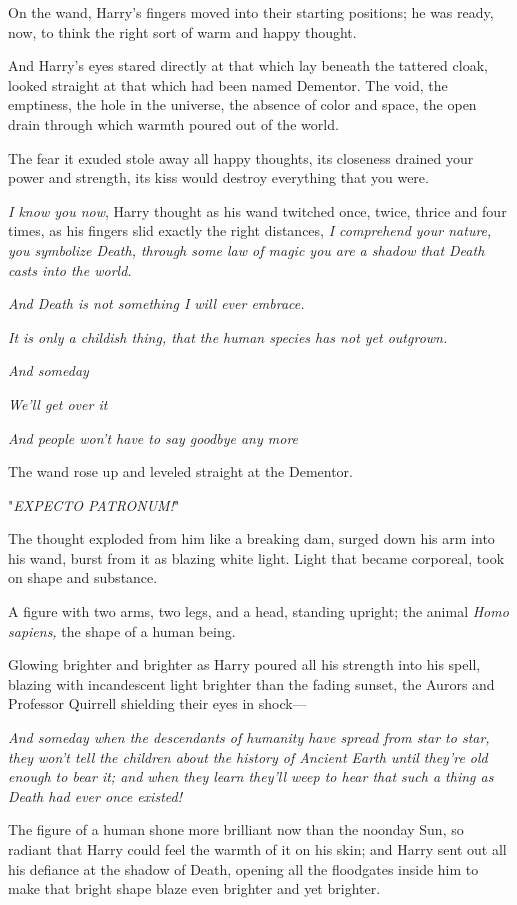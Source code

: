 On the wand, Harry's fingers moved into their starting positions; he was ready,
now, to think the right sort of warm and happy thought.

And Harry's eyes stared directly at that which lay beneath the tattered cloak,
looked straight at that which had been named Dementor. The void, the emptiness,
the hole in the universe, the absence of color and space, the open drain
through which warmth poured out of the world.

The fear it exuded stole away all happy thoughts, its closeness drained your
power and strength, its kiss would destroy everything that you were.

\emph{I know you now}, Harry thought as his wand twitched once, twice, thrice
and four times, as his fingers slid exactly the right distances, \emph{I
comprehend your nature, you symbolize Death, through some law of magic you are
a shadow that Death casts into the world.}

\emph{And Death is not something I will ever embrace.}

\emph{It is only a childish thing, that the human species has not yet outgrown.}

\emph{And someday{\el}}

\emph{We'll get over it{\el}}

\emph{And people won't have to say goodbye any more{\el}}

The wand rose up and leveled straight at the Dementor.

"\emph{EXPECTO PATRONUM!}"

The thought exploded from him like a breaking dam, surged down his arm into his
wand, burst from it as blazing white light. Light that became corporeal, took
on shape and substance.

A figure with two arms, two legs, and a head, standing upright; the animal
\emph{Homo sapiens,} the shape of a human being.

Glowing brighter and brighter as Harry poured all his strength into his spell,
blazing with incandescent light brighter than the fading sunset, the Aurors and
Professor Quirrell shielding their eyes in shock—

\emph{And someday when the descendants of humanity have spread from star to
star, they won't tell the children about the history of Ancient Earth until
they're old enough to bear it; and when they learn they'll weep to hear that
such a thing as Death had ever once existed!}

The figure of a human shone more brilliant now than the noonday Sun, so radiant
that Harry could feel the warmth of it on his skin; and Harry sent out all his
defiance at the shadow of Death, opening all the floodgates inside him to make
that bright shape blaze even brighter and yet brighter.

